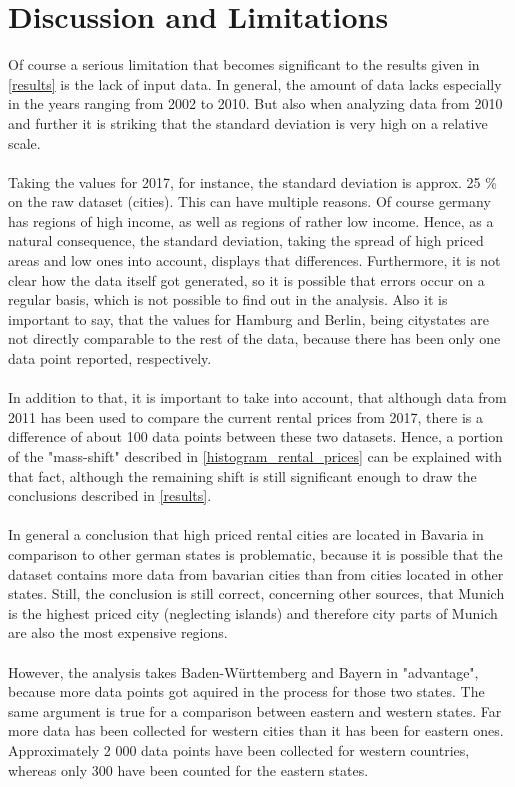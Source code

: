 \documentclass{article}
\begin{document}
	\section{Discussion and Limitations}
	\label{limitations}
	Of course a serious limitation that becomes significant to the results given in \cref{results} is the lack of input data. In general, the amount of data lacks especially in the years ranging from 2002 to 2010. But also when analyzing data from 2010 and further it is striking that the standard deviation is very high on a relative scale.\\\\
	Taking the values for 2017, for instance, the standard deviation is approx. 25 \% on the raw dataset (cities). This can have multiple reasons. Of course germany has regions of high income, as well as regions of rather low income. Hence, as a natural consequence, the standard deviation, taking the spread of high priced areas and low ones into account, displays that differences. Furthermore, it is not clear how the data itself got generated, so it is possible that errors occur on a regular basis, which is not possible to find out in the analysis. Also it is important to say, that the values for Hamburg and Berlin, being citystates are not directly comparable to the rest of the data, because there has been only one data point reported, respectively.\\\\
	In addition to that, it is important to take into account, that although data from 2011 has been used to compare the current rental prices from 2017, there is a difference of about 100 data points between these two datasets. Hence, a portion of the "mass-shift" described in \cref{histogram_rental_prices} can be explained with that fact, although the remaining shift is still significant enough to draw the conclusions described in \cref{results}. \\\\
	In general a conclusion that high priced rental cities are located in Bavaria in comparison to other german states is problematic, because it is possible that the dataset contains more data from bavarian cities than from cities located in other states. Still, the conclusion is still correct, concerning other sources, that Munich is the highest priced city (neglecting islands) and therefore city parts of Munich are also the most expensive regions. \cite{munich_prices}\\\\
	However, the analysis takes Baden-Württemberg and Bayern in "advantage", because more data points got aquired in the process for those two states. The same argument is true for a comparison between eastern and western states. Far more data has been collected for western cities than it has been for eastern ones. Approximately 2 000 data points have been collected for western countries, whereas only 300 have been counted for the eastern states.


\end{document}
